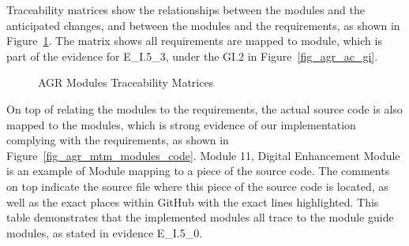 Traceability matrices show the relationships between the modules and the anticipated changes, and between the modules and the requirements, as shown in Figure~\ref{fig_agr_mtm}. The matrix shows all requirements are mapped to module, which is part of the evidence for E\_I.5\_3, under the GI.2 in Figure~\ref{fig_agr_ac_gi}.

\begin{figure}[H]
    \centering
    \caption[AGR Modules Traceability Matrices]{AGR Modules Traceability Matrices}
    \label{fig_agr_mtm}
\end{figure}

On top of relating the modules to the requirements, the actual source code is also mapped to the modules, which is strong evidence of our implementation complying with the requirements, as shown in Figure~\ref{fig_agr_mtm_modules_code}. Module 11, Digital Enhancement Module is an example of Module mapping to a piece of the source code. The comments on top indicate the source file where this piece of the source code is located, as well as the exact places within GitHub with the exact lines highlighted. This table demonstrates that the implemented modules all trace to the module guide modules, as stated in evidence E\_I.5\_0.


